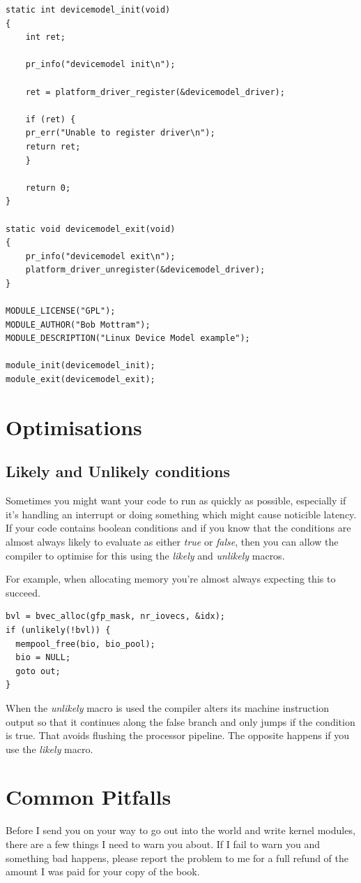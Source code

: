 \documentclass[11pt]{article}
\begin{document}
\begin{verbatim}
static int devicemodel_init(void)
{
    int ret;

    pr_info("devicemodel init\n");

    ret = platform_driver_register(&devicemodel_driver);

    if (ret) {
	pr_err("Unable to register driver\n");
	return ret;
    }

    return 0;
}

static void devicemodel_exit(void)
{
    pr_info("devicemodel exit\n");
    platform_driver_unregister(&devicemodel_driver);
}

MODULE_LICENSE("GPL");
MODULE_AUTHOR("Bob Mottram");
MODULE_DESCRIPTION("Linux Device Model example");

module_init(devicemodel_init);
module_exit(devicemodel_exit);
\end{verbatim}
\section{Optimisations}
\label{sec:org906f9cc}
\subsection{Likely and Unlikely conditions}
\label{sec:org63658ee}
Sometimes you might want your code to run as quickly as possible, especially if it's handling an interrupt or doing something which might cause noticible latency. If your code contains boolean conditions and if you know that the conditions are almost always likely to evaluate as either \emph{true} or \emph{false}, then you can allow the compiler to optimise for this using the \emph{likely} and \emph{unlikely} macros.

For example, when allocating memory you're almost always expecting this to succeed.

\begin{verbatim}
bvl = bvec_alloc(gfp_mask, nr_iovecs, &idx);
if (unlikely(!bvl)) {
  mempool_free(bio, bio_pool);
  bio = NULL;
  goto out;
}
\end{verbatim}

When the \emph{unlikely} macro is used the compiler alters its machine instruction output so that it continues along the false branch and only jumps if the condition is true. That avoids flushing the processor pipeline. The opposite happens if you use the \emph{likely} macro.
\section{Common Pitfalls}
\label{sec:org0e8d92a}
Before I send you on your way to go out into the world and write kernel modules, there are a few things I need to warn you about. If I fail to warn you and something bad happens, please report the problem to me for a full refund of the amount I was paid for your copy of the book.
\end{document}
